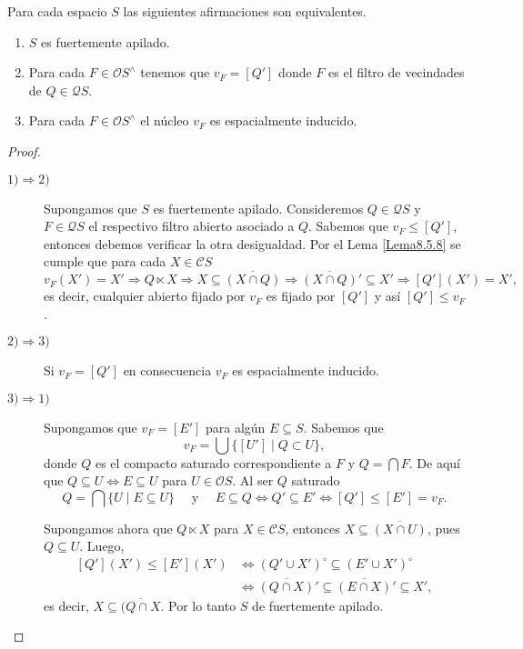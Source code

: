 \begin{lem}\label{Lema8.5.11} 
    Para cada espacio $S$ las siguientes afirmaciones son equivalentes.
    \begin{enumerate}
        \item $S$ es fuertemente apilado.
        \item Para cada $F\in \mathcal{O}S^\wedge$ tenemos que $v_F=[Q']$ donde $F$ es el filtro de vecindades de $Q\in \mathcal{Q}S$.
        \item Para cada $F\in \mathcal{O}S^\wedge$ el núcleo $v_F$ es espacialmente inducido.
    \end{enumerate}
\end{lem}

\begin{proof}
\begin{description}
    \item[$1)\Rightarrow 2)$] Supongamos que $S$ es fuertemente apilado. Consideremos $Q\in \mathcal{Q}S$ y $F\in\mathcal{Q}S$ el respectivo filtro abierto asociado a $Q$. Sabemos que $v_F\leq [Q']$, entonces debemos verificar la otra desigualdad. Por el Lema \ref{Lema8.5.8} se cumple que para cada $X\in \mathcal{C}S$
    \[
    v_F(X')=X'\Rightarrow Q\ltimes X\Rightarrow X\subseteq \overline{(X\cap Q)}\Rightarrow \overline{(X\cap Q)}'\subseteq X'\Rightarrow [Q'](X')=X',
    \]  
    es decir, cualquier abierto fijado por $v_F$ es fijado por $[Q']$ y así $[Q']\leq v_F$.

    \item[$2)\Rightarrow 3)$] Si $v_F=[Q']$ en consecuencia $v_F$ es espacialmente inducido.

    \item[$3)\Rightarrow 1)$] Supongamos que $v_F=[E']$ para algún $E\subseteq S$. Sabemos que 
    \[
    v_F=\bigcup\{[U']\mid Q\subset U\},
    \]
    donde $Q$ es el compacto saturado correspondiente a $F$ y $Q=\bigcap F$. De aquí que  $Q\subseteq U \Leftrightarrow E\subseteq U$ para $U\in \mathcal{O}S$. Al ser $Q$ saturado
    \[
    Q=\bigcap \{U\mid E\subseteq U\}\quad\mbox{ y }\quad E\subseteq Q\Leftrightarrow Q'\subseteq E'\Leftrightarrow [Q']\leq [E']=v_F.
    \]

    Supongamos ahora que $Q\ltimes X$ para $X\in \mathcal{C}S$, entonces $X\subseteq \overline{(X\cap U)}$, pues $Q\subseteq U$. Luego, 
    \[
    \begin{split}
    [Q'](X')\leq [E'](X')&\Leftrightarrow (Q'\cup X')^\circ \subseteq (E'\cup X')^\circ\\
    &\Leftrightarrow \overline{(Q\cap X)}'\subseteq \overline{(E\cap X)}'\subseteq X',
    \end{split}
    \]
    es decir, $X\subseteq \overline{(Q\cap X}$. Por lo tanto $S$ de fuertemente apilado.
\end{description}
\end{proof}

